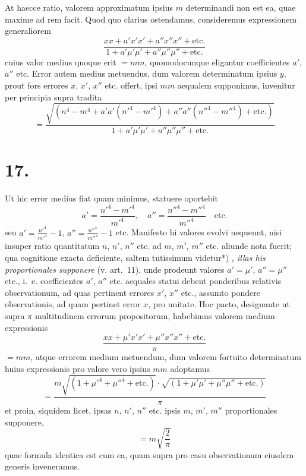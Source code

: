 \documentclass[12pt,a4paper]{book}
\begin{document}
At haecce ratio, valorem approximatum ipsius $m$ determinandi non est ea, quae maxime ad rem facit. Quod quo clarius ostendamus, consideremus expressionem generaliorem
%
\begin{equation*}
\frac{xx+a'x'x'+a''x''x''+\text{etc.}}{1+a'\mu'\mu'+a''\mu''\mu''+\text{etc.}}
\end{equation*}
cuius valor medius quoque erit $=mm$, quomodocunque eligantur coefficientes $a'$, $a''$ etc. Error autem medius metuendus, dum valorem determinatum ipsius $y$, prout fors errores $x$, $x'$, $x''$ etc. offert, ipsi $mm$ aequalem supponimus, invenitur per principia supra tradita
%
\begin{equation*}
=\frac{\sqrt{(n^4-m^4+a'a'(n'^4-m'^4)+a''a''(n''^4-m''^4)+\text{etc.})}}{1+a'\mu'\mu'+a''\mu''\mu''+\text{etc.}}
\end{equation*}

\section*{17.}
\label{sec:art17}

Ut hic error medius fiat quam minimus, statuere oportebit
%
\begin{equation*}
a'=\frac{n'^4-m'^4}{m'^4},\quad a''=\frac{n''^4-m''^4}{m''^4}\quad\text{etc.}
\end{equation*}
seu $a'=\tfrac{n'^4}{m'^4}-1$, $a''=\tfrac{n''^4}{m''^4}-1$ etc. Manifesto hi valores evolvi nequeunt, nisi insuper ratio quantitatum $n$, $n'$, $n''$ etc. ad $m$, $m'$, $m''$ etc. aliunde nota fuerit; qua cognitione exacta deficiente, saltem tutissimum videtur*) \textit{, illas his proportionales supponere} (v. art.~11), unde prodeunt valores $a'=\mu'$, $a''=\mu''$ etc., i.~e. coefficientes $a'$, $a''$ etc. aequales statui debent ponderibus relativis observationum, ad quas pertinent errores $x'$, $x''$ etc., assumto pondere observationis, ad quam pertinet error $x$, pro unitate. Hoc pacto, designante ut supra $\pi$ multitudinem errorum propositorum, habebimus valorem medium expressionis
%
\begin{equation*}
\frac{xx+\mu'x'x'+\mu''x''x''+\text{etc.}}{\pi}
\end{equation*}
$=mm$, atque errorem medium metuendum, dum valorem fortuito determinatum huius expressionis pro valore vero ipsius $mm$ adoptamus
%
\begin{equation*}
=\frac{m\sqrt{(1+\mu'^4+\mu''^4+\text{etc.})}\cdot\sqrt{(1+\mu'\mu'+\mu''\mu''+\text{etc.})}}{\pi}
\end{equation*}
et proin, siquidem licet, ipsas $n$, $n'$, $n''$ etc. ipsis $m$, $m'$, $m''$ proportionales supponere,
%
\begin{equation*}
=m\sqrt{\frac{2}{\pi}}
\end{equation*}
quae formula identica est cum ea, quam supra pro casu observationum eiusdem generis inveneramus.
\end{document}

